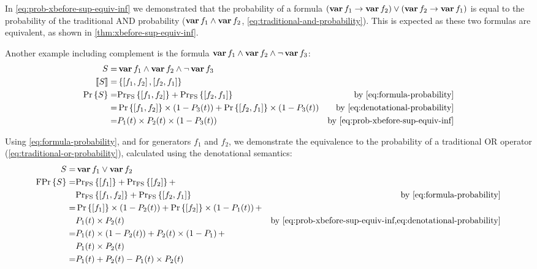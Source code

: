 In \ref{eq:prob-xbefore-sup-equiv-inf} we demonstrated that the probability of a formula $\left(\operatorname{\mathbf{var}} f_1 \rightarrow \operatorname{\mathbf{var}} f_2\right) \lor \left(\operatorname{\mathbf{var}} f_2 \rightarrow \operatorname{\mathbf{var}} f_1\right)$ is equal to the probability of the traditional \ac{AND} probability ($\operatorname{\mathbf{var}} f_1 \land \operatorname{\mathbf{var}} f_2$, \cref{eq:traditional-and-probability}).
This is expected as these two formulas are equivalent, as shown in \cref{thm:xbefore-sup-equiv-inf}.

Another example including complement is the formula $\operatorname{\mathbf{var}} f_1 \land \operatorname{\mathbf{var}} f_2 \land \lnot \operatorname{\mathbf{var}} f_3$:
%
\begin{align}
S = & \var{f_1} \land \var{f_2} \land \lnot \var{f_3}\nonumber\\
\denote{S} = & 
	\left\{
		\left[f_1, f_2\right] ,
		\left[f_2, f_1\right]
	\right\} \nonumber\\
\probability{S} = &
\denotationalprob{\left[f_1,f_2\right]} + \denotationalprob{\left[f_2,f_1\right]} 
  & \text{by \cref{eq:formula-probability}}\nonumber\\
= & \probability{\left[f_1,f_2\right]}\times \left(1 - P_3(t)\right)
+ \probability{\left[f_2,f_1\right]}\times \left(1 - P_3(t)\right)
	& \text{by \cref{eq:denotational-probability}}\nonumber\\
= & P_1(t) \times P_2(t) \times \left(1 - P_3(t)\right) & \text{by \cref{eq:prob-xbefore-sup-equiv-inf}}
\end{align}

Using \cref{eq:formula-probability}, and for generators $f_1$ and $f_2$, we demonstrate the equivalence to the probability of a traditional \ac{OR} operator (\cref{eq:traditional-or-probability}), calculated using the denotational semantics:
%
\begin{align}
S = & \vari{1} \lor \vari{2}\nonumber\\
\formulaprob{S} = & \denotationalprob{\left[f_1\right]} +
  \denotationalprob{\left[f_2\right]} + \nonumber\\
  & \denotationalprob{\left[f_1,f_2\right]} +
  \denotationalprob{\left[f_2,f_1\right]}
  & \text{by \cref{eq:formula-probability}}
\nonumber\\
= &\probability{\left[f_1\right]}\times\left(1 - P_2(t)\right) + 
\probability{\left[f_2\right]}\times\left(1 - P_1(t)\right) +\nonumber\\
&P_1(t) \times P_2(t) & \text{by \cref{eq:prob-xbefore-sup-equiv-inf,eq:denotational-probability}}\nonumber\\
= & P_1(t) \times \left(1 - P_2(t)\right) + P_2(t) \times \left(1 - P_1\right) + \nonumber\\
  & P_1(t) \times P_2(t)\nonumber\\
= & P_1(t) + P_2(t) - P_1(t) \times P_2(t)
\end{align}

